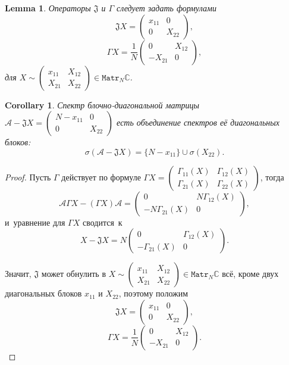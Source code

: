\documentclass[a4paper]{article}
\newtheorem{lem}{Lemma}
\newtheorem{crl}{Corollary}
\theoremstyle{definition}
\begin{document}
\begin{lem}
    Операторы \( \mathfrak{J} \) и \( \Gamma \)
    следует задать формулами
    \[
        \mathfrak{J} X = \begin{pmatrix} x_{11} & 0 \\ 0 & X_{22} \end{pmatrix}, \]
    \[
        \Gamma X = \frac{1}{N} \begin{pmatrix} 0 & X_{12} \\ -X_{21} & 0 \end{pmatrix}, \]
        для \( X\sim \begin{pmatrix}x_{11} & X_{12} \\ X_{21} & X_{22}\end{pmatrix} \in \mathtt{Matr}_N\mathbb{C} \).

\end{lem}
\begin{crl}
    Спектр блочно-диагональной матрицы
    \( \mathcal{A} - \mathfrak{J}X = \begin{pmatrix} N - x_{11} & 0 \\ 0 & X_{22} \end{pmatrix} \)
    есть объединение спектров е\"е диагональных блоков:
    \[
        \sigma(\mathcal{A} - \mathfrak{J} X) = \{ N - x_{11} \} \cup \sigma(X_{22}). \]
\end{crl}
\begin{proof}
Пусть \( \Gamma \) действует по формуле
\( \Gamma X = \begin{pmatrix} \Gamma_{11}(X) & \Gamma_{12}(X) \\
                              \Gamma_{21}(X) & \Gamma_{22}(X)
                              \end{pmatrix} \), тогда
\[
    \mathcal{A} \Gamma X - (\Gamma X)\mathcal{A} = 
    \begin{pmatrix} 0 & N\Gamma_{12}(X) \\
        - N\Gamma_{21}(X) & 0
        \end{pmatrix}, \]
и~уравнение для \( \Gamma X \) сводится~к
\[
    X - \mathfrak{J} X =
    N \begin{pmatrix} 0 & \Gamma_{12}(X) \\
        - \Gamma_{21}(X) & 0
        \end{pmatrix}. \]

Значит, \( \mathfrak{J} \) может обнулить в
    \( X \sim
    \begin{pmatrix}
    x_{11} & X_{12} \\
    X_{21} & X_{22}
    \end{pmatrix} \in \mathtt{Matr}_N\mathbb{C} \)
    вс\"е, кроме двух диагональных блоков \( x_{11} \) и \( X_{22} \),
    поэтому положим
\[
    \mathfrak{J} X = \begin{pmatrix} x_{11} & 0 \\ 0 & X_{22} \end{pmatrix}, \]
\[
    \Gamma X = \frac{1}{N}\begin{pmatrix} 0 & X_{12} \\ -X_{21} & 0 \end{pmatrix}. \]
\end{proof}
\end{document}
